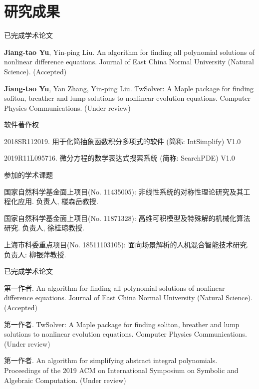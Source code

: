 \chapter*{研究成果}

\ifdefined\RELESE %

\noindent 已完成学术论文
\begin{enumerate}[label={[\arabic*]},leftmargin=*]
\item {\bf Jiang-tao Yu}, Yin-ping Liu. An algorithm for finding all polynomial
solutions of nonlinear difference equations. Journal of East China Normal University (Natural Science). (Accepted)
\item {\bf Jiang-tao Yu}, Yan Zhang, Yin-ping Liu. TwSolver: A Maple package for finding soliton, breather and lump solutions to nonlinear evolution equations. Computer Physics Communications. (Under review)
\end{enumerate}

\noindent 软件著作权
\begin{enumerate}[label={[\arabic*]},leftmargin=*]
\item 2018SR112019. 用于化简抽象函数积分多项式的软件 (简称: IntSimplify) V1.0
\item 2019R11L095716. 微分方程的数学表达式搜索系统 (简称: SearchPDE) V1.0
\end{enumerate}

\noindent 参加的学术课题
\begin{enumerate}[label={[\arabic*]},leftmargin=*]
\item 国家自然科学基金面上项目(No. 11435005): 非线性系统的对称性理论研究及其工程化应用. 负责人, 楼森岳教授.
\item 国家自然科学基金面上项目(No. 11871328): 高维可积模型及特殊解的机械化算法研究. 负责人, 徐桂琼教授.
\item 上海市科委重点项目(No. 18511103105): 面向场景解析的人机混合智能技术研究. 负责人: 柳银萍教授.
\end{enumerate}

\else %

\noindent 已完成学术论文
\begin{enumerate}[label={[\arabic*]},leftmargin=*]
\item 第一作者. An algorithm for finding all polynomial
solutions of nonlinear difference equations. Journal of East China Normal University (Natural Science). (Accepted)
\item 第一作者. TwSolver: A Maple package for finding soliton, breather and lump solutions to nonlinear evolution equations. Computer Physics Communications. (Under review)
\item 第一作者.  An algorithm for simplifying abstract integral polynomials. Proceedings of the 2019 ACM on International Symposium on Symbolic and Algebraic Computation. (Under review)
\end{enumerate}

